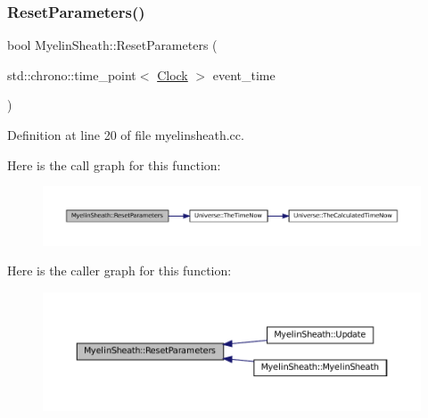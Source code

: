 \mbox{\label{class_myelin_sheath_af1174b93be36aa43506a4ba9857d92a4}} 
\subsubsection{\texorpdfstring{Reset\+Parameters()}{ResetParameters()}}
{\footnotesize\ttfamily bool Myelin\+Sheath\+::\+Reset\+Parameters (\begin{DoxyParamCaption}\item[{std\+::chrono\+::time\+\_\+point$<$ \mbox{\hyperlink{universe_8h_a0ef8d951d1ca5ab3cfaf7ab4c7a6fd80}{Clock}} $>$}]{event\+\_\+time }\end{DoxyParamCaption})}



Definition at line 20 of file myelinsheath.\+cc.

Here is the call graph for this function\+:\nopagebreak
\begin{figure}[H]
\begin{center}
\leavevmode
\includegraphics[width=350pt]{class_myelin_sheath_af1174b93be36aa43506a4ba9857d92a4_cgraph}
\end{center}
\end{figure}
Here is the caller graph for this function\+:\nopagebreak
\begin{figure}[H]
\begin{center}
\leavevmode
\includegraphics[width=350pt]{class_myelin_sheath_af1174b93be36aa43506a4ba9857d92a4_icgraph}
\end{center}
\end{figure}
\mbox{\label{class_myelin_sheath_afb9cd377a71881558f48cf8bb226af77}} 
